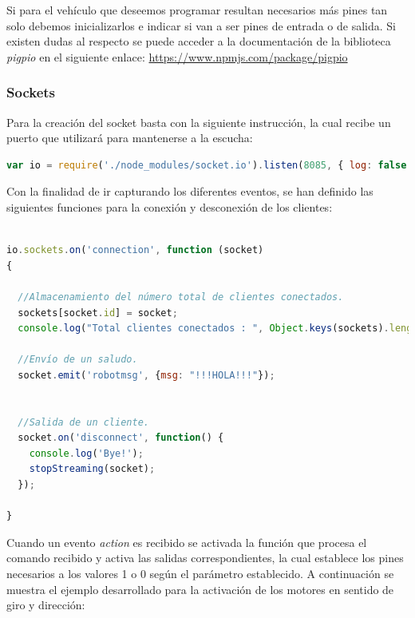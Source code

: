 Si para el vehículo que deseemos programar resultan necesarios más pines tan solo debemos inicializarlos e indicar si van a ser pines de entrada o de salida. Si existen dudas al respecto se puede 
acceder a la documentación de la biblioteca \emph{pigpio} en el siguiente enlace: \url{https://www.npmjs.com/package/pigpio}



\subsubsection{Sockets}


Para la creación del socket basta con la siguiente instrucción, la cual recibe un puerto que utilizará para mantenerse a la escucha: 

\begin{lstlisting}[language=JavaScript]
  var io = require('./node_modules/socket.io').listen(8085, { log: false });
\end{lstlisting}


Con la finalidad de ir capturando los diferentes eventos, se han definido las siguientes funciones para la conexión y desconexión de los clientes:

\begin{lstlisting}[language=JavaScript]

io.sockets.on('connection', function (socket)
{

  //Almacenamiento del número total de clientes conectados.
  sockets[socket.id] = socket;
  console.log("Total clientes conectados : ", Object.keys(sockets).length);
  
  //Envío de un saludo.
  socket.emit('robotmsg', {msg: "!!!HOLA!!!"});


  //Salida de un cliente.
  socket.on('disconnect', function() {
    console.log('Bye!');
    stopStreaming(socket);
  });  
  
}
\end{lstlisting}

Cuando un evento \emph{action} es recibido se activada la función que procesa el comando recibido y activa las salidas correspondientes, la cual establece los pines necesarios a los valores
1 o 0 según el parámetro establecido. A continuación se muestra el ejemplo desarrollado para la activación de los motores en sentido de giro y dirección:\\

